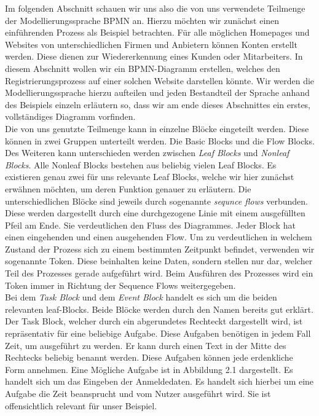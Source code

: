 Im folgenden Abschnitt schauen wir uns also die von uns verwendete Teilmenge der Modellierungssprache BPMN an. Hierzu möchten wir zunächst einen einführenden Prozess als Beispiel betrachten. Für alle möglichen Homepages und Websites von unterschiedlichen Firmen und Anbietern können Konten erstellt werden. Diese dienen zur Wiedererkennung eines Kunden oder Mitarbeiters. In diesem Abschnitt wollen wir ein BPMN-Diagramm erstellen, welches den Registrierungsprozess auf einer solchen Website darstellen könnte. Wir werden die Modellierungssprache hierzu aufteilen und jeden Bestandteil der Sprache anhand des Beispiels einzeln erläutern so, dass wir am ende dieses Abschnittes ein erstes, vollständiges Diagramm vorfinden.\\
Die von uns genutzte Teilmenge kann in einzelne Blöcke eingeteilt werden. Diese können in zwei Gruppen unterteilt werden. Die Basic Blocks und die Flow Blocks. Des Weiteren kann unterschieden werden zwischen \emph{Leaf Blocks} und \emph{Nonleaf Blocks}. Alle Nonleaf Blocks bestehen aus beliebig vielen Leaf Blocks. Es existieren genau zwei für uns relevante Leaf Blocks, welche wir hier zunächst erwähnen möchten, um deren Funktion genauer zu erläutern. Die unterschiedlichen Blöcke sind jeweils durch sogenannte \emph{sequnce flows} verbunden. Diese werden dargestellt durch eine durchgezogene Linie mit einem ausgefüllten Pfeil am Ende. Sie verdeutlichen den Fluss des Diagrammes. Jeder Block hat einen eingehenden und einen ausgehenden Flow. Um zu verdeutlichen in welchem Zustand der Prozess sich zu einem bestimmten Zeitpunkt befindet, verwenden wir sogenannte Token. Diese beinhalten keine Daten, sondern stellen nur dar, welcher Teil des Prozesses gerade aufgeführt wird. Beim Ausführen des Prozesses wird ein Token immer in Richtung der Sequence Flows weitergegeben.\\
Bei dem \emph{Task Block} und dem \emph{Event Block} handelt es sich um die beiden relevanten leaf-Blocks. Beide Blöcke werden durch den Namen bereits gut erklärt. Der Task Block, welcher durch ein abgerundetes Rechteckt dargestellt wird, ist repräsentativ für eine beliebige Aufgabe. Diese Aufgaben benötigen in jedem Fall Zeit, um ausgeführt zu werden. Er kann durch einen Text in der Mitte des Rechtecks beliebig benannt werden. Diese Aufgaben können jede erdenkliche Form annehmen. Eine Mögliche Aufgabe ist in Abbildung 2.1 dargestellt. Es handelt sich um das Eingeben der Anmeldedaten. Es handelt sich hierbei um eine Aufgabe die Zeit beansprucht und vom Nutzer ausgeführt wird. Sie ist offensichtlich relevant für unser Beispiel. 

